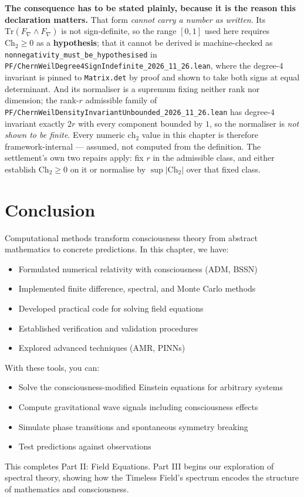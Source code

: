 \noindent \textbf{The consequence has to be stated plainly, because it is the
reason this declaration matters.} That form \emph{cannot carry a number as
written}. Its $\mathrm{Tr}(F_\nabla \wedge F_\nabla)$ is not sign-definite, so the
range $[0,1]$ used here requires $\mathrm{Ch}_2 \geq 0$ as a \textbf{hypothesis};
that it cannot be derived is machine-checked as
\texttt{nonnegativity\_must\_be\_hypothesised} in
\texttt{PF/ChernWeilDegree4SignIndefinite\_2026\_11\_26.lean}, where the
degree-$4$ invariant is pinned to \texttt{Matrix.det} by proof and shown to take
both signs at equal determinant. And its normaliser is a supremum fixing neither
rank nor dimension; the rank-$r$ admissible family of
\texttt{PF/ChernWeilDensityInvariantUnbounded\_2026\_11\_26.lean} has degree-$4$
invariant exactly $2r$ with every component bounded by $1$, so the normaliser is
\emph{not shown to be finite}. Every numeric $\text{ch}_2$ value in this chapter
is therefore framework-internal --- assumed, not computed from the definition.
The settlement's own two repairs apply: fix $r$ in the admissible class, and
either establish $\mathrm{Ch}_2 \geq 0$ on it or normalise by
$\sup|\mathrm{Ch}_2|$ over that fixed class.


\section{Conclusion}

Computational methods transform consciousness theory from abstract mathematics to concrete predictions. In this chapter, we have:

\begin{itemize}
\item Formulated numerical relativity with consciousness (ADM, BSSN)
\item Implemented finite difference, spectral, and Monte Carlo methods
\item Developed practical code for solving field equations
\item Established verification and validation procedures
\item Explored advanced techniques (AMR, PINNs)
\end{itemize}

With these tools, you can:
\begin{itemize}
\item Solve the consciousness-modified Einstein equations for arbitrary systems
\item Compute gravitational wave signals including consciousness effects
\item Simulate phase transitions and spontaneous symmetry breaking
\item Test predictions against observations
\end{itemize}

This completes Part II: Field Equations. Part III begins our exploration of spectral theory, showing how the Timeless Field's spectrum encodes the structure of mathematics and consciousness.

